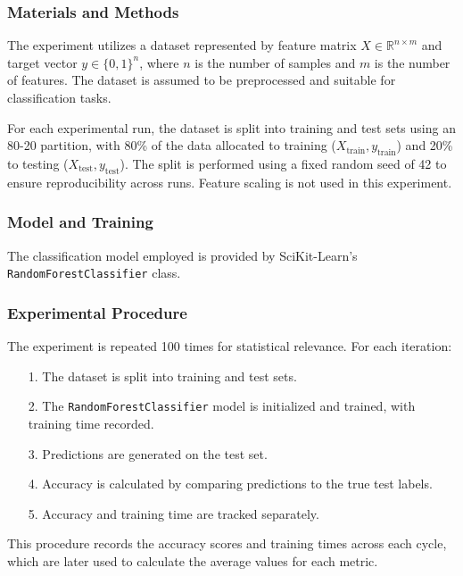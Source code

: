 \documentclass{article}
\theoremstyle{plain}
\theoremstyle{definition}
\theoremstyle{remark}
\begin{document}
\subsubsection{Materials and Methods}

The experiment utilizes a dataset represented by feature matrix $ X \in \mathbb{R}^{n \times m} $ and target vector $ y \in \{0, 1\}^n $, where $ n $ is the number of samples and $ m $ is the number of features. The dataset is assumed to be preprocessed and suitable for classification tasks.

For each experimental run, the dataset is split into training and test sets using an 80-20 partition, with 80\% of the data allocated to training ($ X_{\text{train}}, y_{\text{train}} $) and 20\% to testing ($ X_{\text{test}}, y_{\text{test}} $). The split is performed using a fixed random seed of 42 to ensure reproducibility across runs. Feature scaling is not used in this experiment.


\subsubsection{Model and Training}

The classification model employed is provided by SciKit-Learn's \texttt{RandomForestClassifier} class.


\subsubsection{Experimental Procedure}

The experiment is repeated 100 times for statistical relevance. For each iteration:

\begin{itemize}
	\item [1.] The dataset is split into training and test sets.
	\item [2.] The \texttt{RandomForestClassifier} model is initialized and trained, with training time recorded.
	\item [3.] Predictions are generated on the test set.
	\item [4.] Accuracy is calculated by comparing predictions to the true test labels.
	\item [5.] Accuracy and training time are tracked separately.
\end{itemize}

This procedure records the accuracy scores and training times across each cycle, which are later used to calculate the average values for each metric.
\end{document}
